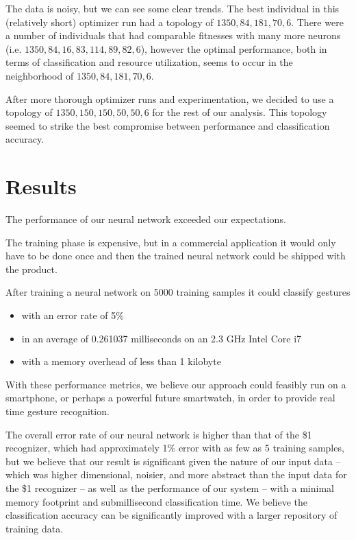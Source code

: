 \documentclass{report}
\begin{document}
The data is noisy, but we can see some clear trends. The best individual in this (relatively short) optimizer run had a topology of $1350, 84, 181, 70, 6$. There were a number of individuals that had comparable fitnesses with many more neurons (i.e. $1350, 84, 16, 83, 114, 89, 82, 6$), however the optimal performance, both in terms of classification and resource utilization, seems to occur in the neighborhood of $1350, 84, 181, 70, 6$.

After more thorough optimizer runs and experimentation, we decided to use a topology of $1350, 150, 150, 50, 50, 6$ for the rest of our analysis. This topology seemed to strike the best compromise between performance and classification accuracy.

\chapter{Results}

The performance of our neural network exceeded our expectations.

The training phase is expensive, but in a commercial application it would only have to be done once and then the trained neural network could be shipped with the product.

After training a neural network on 5000 training samples it could classify gestures
\begin{itemize}
\item with an error rate of 5\%
\item in an average of 0.261037 milliseconds on an 2.3 GHz Intel Core i7
\item with a memory overhead of less than 1 kilobyte
\end{itemize}
With these performance metrics, we believe our approach could feasibly run on a smartphone, or perhaps a powerful future smartwatch, in order to provide real time gesture recognition.

The overall error rate of our neural network is higher than that of the \$1 recognizer, which had approximately 1\% error with as few as 5 training samples, but we believe that our result is significant given the nature of our input data -- which was higher dimensional, noisier, and more abstract than the input data for the \$1 recognizer -- as well as the performance of our system -- with a minimal memory footprint and submillisecond classification time. We believe the classification accuracy can be significantly improved with a larger repository of training data.
\end{document}

